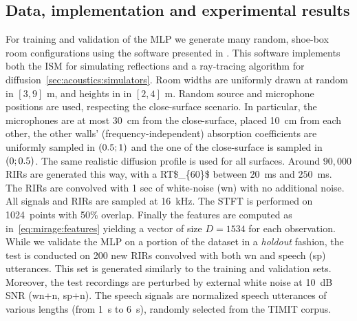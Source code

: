 \subsection{Data, implementation and experimental results}\label{subsec:lantern:simple:mpl:results}
For training and validation of the \ac{MLP} we generate many random, shoe-box room configurations using the software presented in .
This software implements both the \acf{ISM} for simulating reflections and a ray-tracing algorithm for diffusion~\cref{sec:acoustics:simulators}.
Room widths are uniformly drawn at random in $[3, 9]$ m, and heights in in $[2, 4]$ m.
Random source and microphone positions are used, respecting the close-surface scenario.
In particular, the microphones are at most 30~cm from the close-surface, placed 10~cm from each other, the other walls' (frequency-independent) absorption coefficients are uniformly sampled in $\kintervoo{0.5}{1}$ and the one of the close-surface is sampled in $\kintervoo{0}{0.5}$.
The same realistic diffusion profile  is used for all surfaces.
Around $90,000$ \acp{RIR} are generated this way, with a \ac{RT$_{60}$} between $20$~ms and $250$~ms.
\\The \acp{RIR} are convolved with 1 sec of white-noise (wn) with no additional noise.
All signals and \acp{RIR} are sampled at 16~kHz.
The \ac{STFT} is performed on 1024~points with 50\% overlap.
Finally the features are computed as in~\eqref{eq:mirage:features} yielding a vector of size $D = 1534$ for each observation.
\\While we validate the \ac{MLP} on a portion of the dataset in a \textit{holdout} fashion, the test is conducted on 200 new \acp{RIR} convolved with both wn and speech (sp) utterances.
This set is generated similarly to the training and validation sets.
Moreover, the test recordings are perturbed by external white noise at 10~dB \acf{SNR} (wn+n, sp+n).
The speech signals are normalized speech utterances of various lengths (from 1~s to 6~s), randomly selected from the TIMIT corpus.

